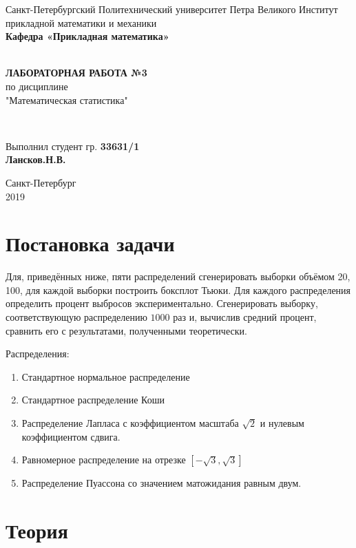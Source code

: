 \documentclass[12pt]{article}
\renewcommand{\listoffigures}{\begingroup  %
\tocsection
\tocfile{\listfigurename}{lof}
\endgroup}
\renewcommand{\listoftables}{\begingroup  %
\tocsection
\tocfile{\listtablename}{lot}
\endgroup}
\begin{document}
\begin{titlepage}
	\center
		Санкт-Петербургский Политехнический 
		университет Петра Великого
		Институт прикладной математики и механики
		\\ \textbf{Кафедра «Прикладная математика»}

	\vfill ~
	\textbf{
		\\ \large ЛАБОРАТОРНАЯ РАБОТА №3
	}
	\\	по дисциплине 
	\\	"Математическая статистика"

	\vfill ~

	Выполнил студент гр. \textbf{33631/1} \\
	\textbf{Лансков.Н.В.} \\ 

\vfill

{\large}	Санкт-Петербург
\\ 2019
\end{titlepage}


\tableofcontents 
\newpage
\listoffigures
\newpage
\listoftables
\newpage

\section{Постановка задачи}
Для, приведённых ниже, пяти распределений сгенерировать выборки объёмом 20, 100, для каждой выборки построить боксплот Тьюки. Для каждого распределения определить процент выбросов экспериментально. Сгенерировать выборку, соответствующую распределению $1000$ раз и, вычислив средний процент, сравнить его с результатами, полученными теоретически.

Распределения:
\begin{enumerate}
\item Стандартное нормальное распределение
\item Стандартное распределение Коши
\item Распределение Лапласа с коэффициентом масштаба $\sqrt{2}$ и нулевым коэффициентом сдвига.
\item Равномерное распределение на отрезке $\left[-\sqrt{3}, \sqrt{3}\right]$
\item Распределение Пуассона со значением матожидания равным двум.
\end{enumerate}

\section{Теория}
\end{document}
